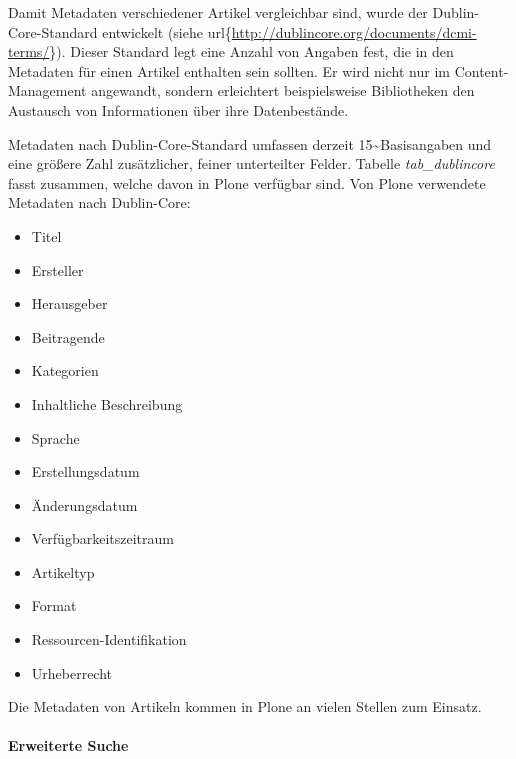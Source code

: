 \documentclass[a4paper,12pt,ngerman]{manual}
\begin{document}
Damit Metadaten verschiedener Artikel vergleichbar sind, wurde der
Dublin-Core-Standard entwickelt (siehe
url\{\href{http://dublincore.org/documents/dcmi-terms/}{http://dublincore.org/documents/dcmi-terms/}\}). Dieser Standard legt eine
Anzahl von Angaben fest, die in den Metadaten für einen Artikel enthalten sein
sollten. Er wird nicht nur im Content-Management angewandt, sondern
erleichtert beispielsweise Bibliotheken den Austausch von Informationen über
ihre Datenbestände.

Metadaten nach Dublin-Core-Standard umfassen derzeit 15\textasciitilde{}Basisangaben und
eine größere Zahl zusätzlicher, feiner unterteilter Felder.
Tabelle \emph{tab\_dublincore} fasst zusammen, welche davon in Plone verfügbar sind.
\hypertarget{tab-dublincore}{}
Von Plone verwendete Metadaten nach Dublin-Core:
\begin{itemize}
\item {} 
Titel

\item {} 
Ersteller

\item {} 
Herausgeber

\item {} 
Beitragende

\item {} 
Kategorien

\item {} 
Inhaltliche Beschreibung

\item {} 
Sprache

\item {} 
Erstellungsdatum

\item {} 
Änderungsdatum

\item {} 
Verfügbarkeitszeitraum

\item {} 
Artikeltyp

\item {} 
Format

\item {} 
Ressourcen-Identifikation

\item {} 
Urheberrecht

\end{itemize}

Die Metadaten von Artikeln kommen in Plone an vielen Stellen zum Einsatz.


\hypertarget{sec-nutz-von-metad-1}{}\paragraph{Erweiterte Suche}
\end{document}

